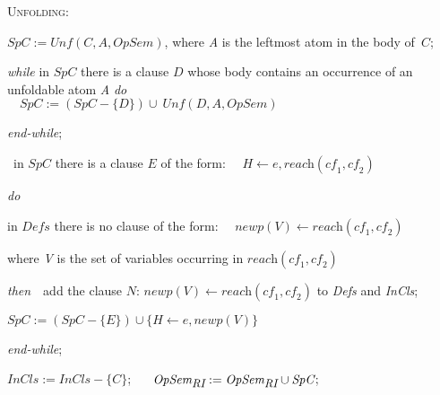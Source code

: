 \documentclass[english]{tlp}
\begin{document}
	\hspace*{3mm}\begin{minipage}{118mm}
		
		\smallskip
		\noindent \textsc{Unfolding}:
		


		\noindent $\textit{SpC} :=\textit{Unf}(C,A,\textit{OpSem})$, 
		where \textit{A} is the leftmost atom in the body of~$C$;
		
		
		\noindent \textit{while}
		\hangindent=8mm in $\textit{SpC}$ there is a clause $D$
		whose body contains an occurrence of an unfoldable atom \textit{A}
		\textit{do} 
		\\
		$\textit{~~~SpC} := (\textit{SpC}- \{ D\}) \cup\ \textit{Unf}(D,A,\textit{OpSem})$


		\noindent \textit{end-while};
		
		
		\smallskip
		
		
		\noindent
		\ in $\textit{SpC}$ there is a clause
		$E$  of the form: 
		~~$H\leftarrow e, \textit{reach}(\textit{cf}_1,\textit{cf}_2)$
		
		\noindent  
		\textit{do}
		
		\smallskip
		
		\hspace*{3mm}\begin{minipage}{115mm}
			
			\noindent
			in $\textit{Defs}$ there is no clause of the form:
			~~$\textit{newp}(V)\leftarrow \textit{reach}(\textit{cf}_1,\textit{cf}_2)$ 
			
			\hspace*{4mm}where {\it V} is the set of variables occurring in $\textit{reach}(\textit{cf}_1,\textit{cf}_2)$
			
			
\noindent
			\textit{then}~~add the clause $N$: $\textit{newp}(V)\leftarrow \textit{reach}(\textit{cf}_1,\textit{cf}_2)$
			to \textit{Defs} and \textit{InCls};
						
			$\textit{SpC} :=(\textit{SpC} -\{E \})\cup \{H\leftarrow e, \textit{newp}(V)\}$
		\end{minipage}
		
		\smallskip
		\noindent
		\textit{end-while};
		
		\smallskip
		
		\noindent $\textit{InCls}:=\textit{InCls}-\{C\}$; ~~
		$\textit{OpSem}_{\textit{\small{RI}}}:=\textit{OpSem}_{\textit{\small{RI}}}\cup \textit{SpC}$;
		
	\end{minipage}
	
\end{document}
